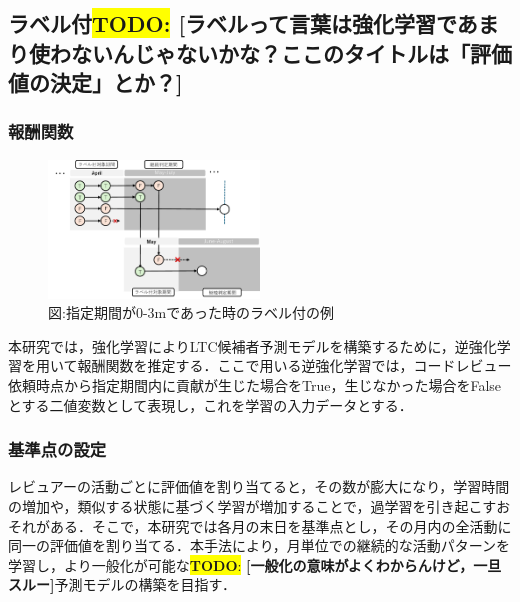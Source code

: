 \documentclass[submit,techrep,noauthor]{ipsj}
\newcommand{\todo}[1]{\colorbox{yellow}{{\bf TODO}:}{\color{red} {\textbf{[#1]}}}}
\begin{document}
\subsection{ラベル付\todo{ラベルって言葉は強化学習であまり使わないんじゃないかな？ここのタイトルは「評価値の決定」とか？}}
\subsubsection{報酬関数}
\begin{figure}[t]
    \centering
    \includegraphics[width = 0.5\textwidth]{./Hashimoto_fig/label.pdf}
    \caption{図:指定期間が0-3mであった時のラベル付の例}
    \label{fig:label}
\end{figure}


本研究では，強化学習によりLTC候補者予測モデルを構築するために，逆強化学習を用いて報酬関数を推定する．ここで用いる逆強化学習では，コードレビュー依頼時点から指定期間内に貢献が生じた場合をTrue，生じなかった場合をFalseとする二値変数として表現し，これを学習の入力データとする．



\subsubsection{基準点の設定}
レビュアーの活動ごとに評価値を割り当てると，その数が膨大になり，学習時間の増加や，類似する状態に基づく学習が増加することで，過学習を引き起こすおそれがある．そこで，本研究では各月の末日を基準点とし，その月内の全活動に同一の評価値を割り当てる．本手法により，月単位での継続的な活動パターンを学習し，より一般化が可能な\todo{一般化の意味がよくわからんけど，一旦スルー}予測モデルの構築を目指す．
\end{document}
